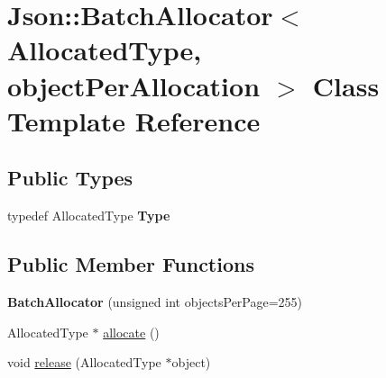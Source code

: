 \hypertarget{class_json_1_1_batch_allocator}{\section{Json\+:\+:Batch\+Allocator$<$ Allocated\+Type, object\+Per\+Allocation $>$ Class Template Reference}
\label{class_json_1_1_batch_allocator}
}
\subsection*{Public Types}
\begin{DoxyCompactItemize}
\item 
\hypertarget{class_json_1_1_batch_allocator_a031e753885fcb007c20511e15f84d1a4}{typedef Allocated\+Type {\bfseries Type}}\label{class_json_1_1_batch_allocator_a031e753885fcb007c20511e15f84d1a4}

\end{DoxyCompactItemize}
\subsection*{Public Member Functions}
\begin{DoxyCompactItemize}
\item 
\hypertarget{class_json_1_1_batch_allocator_a96aae4d9032847b074e72a0cf32bc9ea}{{\bfseries Batch\+Allocator} (unsigned int objects\+Per\+Page=255)}\label{class_json_1_1_batch_allocator_a96aae4d9032847b074e72a0cf32bc9ea}

\item 
Allocated\+Type $\ast$ \hyperlink{class_json_1_1_batch_allocator_a4909756c2d33bd0f07662e88e4f850dd}{allocate} ()
\item 
void \hyperlink{class_json_1_1_batch_allocator_aceb116aceb6bb5bbcfd05433abc04ba5}{release} (Allocated\+Type $\ast$object)
\end{DoxyCompactItemize}


